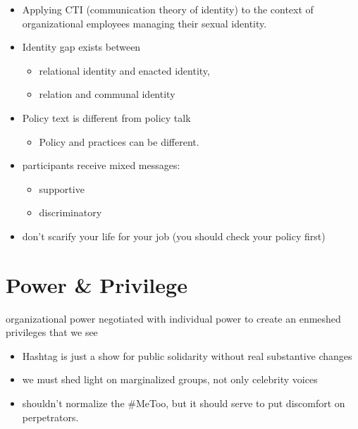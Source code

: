 \documentclass[
]{book}
\providecommand{\tightlist}{%
  \setlength{\itemsep}{0pt}\setlength{\parskip}{0pt}}
\begin{document}
\begin{itemize}
\item
  Applying CTI (communication theory of identity) to the context of
  organizational employees managing their sexual identity.
\item
  Identity gap exists between

  \begin{itemize}
  \item
    relational identity and enacted identity,
  \item
    relation and communal identity
  \end{itemize}
\item
  Policy text is different from policy talk

  \begin{itemize}
  \tightlist
  \item
    Policy and practices can be different.
  \end{itemize}
\item
  participants receive mixed messages:

  \begin{itemize}
  \item
    supportive
  \item
    discriminatory
  \end{itemize}
\item
  don't scarify your life for your job (you should check your policy
  first)
\end{itemize}

\hypertarget{power-privilege}{%
\chapter{Power \& Privilege}\label{power-privilege}}

organizational power negotiated with individual power to create an
enmeshed privileges that we see

\citep{de_la_Garza_2020}

\begin{itemize}
\tightlist
\item
  Hashtag is just a show for public solidarity without real
  substantive changes
\item
  we must shed light on marginalized groups, not only celebrity voices
\item
  shouldn't normalize the \#MeToo, but it should serve to put
  discomfort on perpetrators.
\end{itemize}
\end{document}
